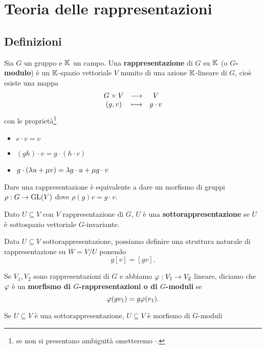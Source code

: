 \chapter{Teoria delle rappresentazioni}

\section{Definizioni}

\begin{definition}[Rappresentazione]
Sia $G$ un gruppo e $\mathbb{K}$ un campo. Una \textbf{rappresentazione} di $G$ su $\mathbb{K}$ (o \textbf{$G$-modulo}) \`e un $\mathbb{K}$-spazio vettoriale $V$ munito di una azione $\mathbb{K}$-lineare di $G$, cio\`e esiste una mappa
\[\begin{array}{ccc} {G\times V} & \longrightarrow & {V}\\ {(g,v)} & \longmapsto & {g\cdot v} \end{array}\]
con le propriet\`a\footnote{se non si presentano ambiguit\`a ometteremo $\cdot$.}
\begin{itemize}
    \item $e\cdot v=v$
    \item $(g h)\cdot v=g\cdot(h\cdot v)$
    \item $g\cdot(\lambda u+\mu v)=\lambda g\cdot u+\mu g\cdot v$
\end{itemize}
\end{definition}
\begin{remark}
    Dare una rappresentazione \`e equivalente a dare un morfismo di gruppi $\rho:G\to \mathrm{GL}(V)$ dove $\rho(g)v=g\cdot v$.
\end{remark}

\begin{definition}[Sottorappresentazione]
Dato $U\subseteq V$ con $V$ rappresentazione di $G$, $U$ \`e una \textbf{sottorappresentazione} se $U$ \`e sottospazio vettoriale $G$-invariante.
\end{definition}
\begin{remark}
Data $U\subseteq V$ sottorappresentazione, possiamo definire una struttura naturale di rappresentazione su $W=V/U$ ponendo
\[g[v]=[gv].\]
\end{remark}

\begin{definition}
Se $V_1,V_2$ sono rappresentazioni di $G$ e abbiamo $\varphi:V_1\to V_2$ lineare, diciamo che $\varphi$ \`e un \textbf{morfismo di $G$-rappresentazioni o di $G$-moduli} se 
\[\varphi(gv_1)=g\varphi(v_1).\]
\end{definition}

\begin{example}
Se $U\subseteq V$ \`e una sottorappresentazione, $U\subseteq V$ \`e morfismo di $G$-moduli
\end{example}

